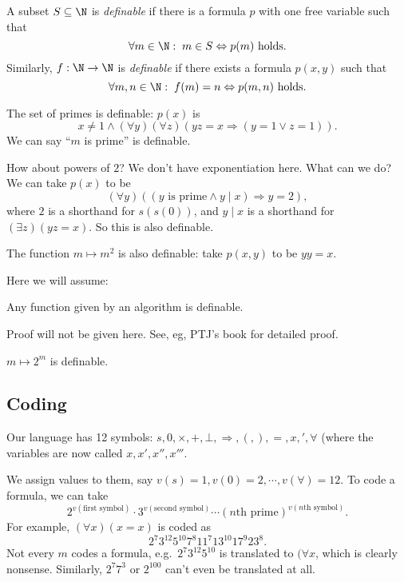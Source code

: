 \documentclass[a4paper]{article}
\begin{document}
\begin{defi}[Definability]
  A subset $S\subseteq \N$ is \emph{definable} if there is a formula $p$ with one free variable such that
  \[
    \forall m\in \N:\; m\in S \Leftrightarrow p(m)\text{ holds}.
  \]
  Similarly, $f: \N \to \N$ is \emph{definable} if there exists a formula $p(x, y)$ such that
  \[
    \forall m, n\in \N:\; f(m) = n \Leftrightarrow p(m, n)\text{ holds}.
  \]
\end{defi}

\begin{eg}
  The set of primes is definable: $p(x)$ is
  \[
    x\not = 1 \wedge (\forall y)(\forall z)(yz = x \Rightarrow (y = 1\vee z = 1)).
  \]
  We can say ``$m$ is prime'' is definable.

  How about powers of $2$? We don't have exponentiation here. What can we do? We can take $p(x)$ to be
  \[
    (\forall y)((y\text{ is prime}\wedge y \mid x) \Rightarrow y = 2),
  \]
  where $2$ is a shorthand for $s(s(0))$, and $y\mid x$ is a shorthand for $(\exists z)(yz = x)$. So this is also definable.

  The function $m\mapsto m^2$ is also definable: take $p(x, y)$ to be $yy = x$.
\end{eg}

Here we will assume:
\begin{fact}
  Any function given by an algorithm is definable.
\end{fact}
Proof will not be given here. See, eg, PTJ's book for detailed proof.

\begin{eg}
  $m\mapsto 2^m$ is definable.
\end{eg}

\subsection*{Coding}
Our language has 12 symbols: $s, 0, \times, +, \bot, \Rightarrow, (, ), =, x, ', \forall$ (where the variables are now called $x, x', x'', x'''$.

We assign values to them, say $v(s) = 1, v(0) = 2, \cdots, v(\forall) = 12$. To code a formula, we can take
\[
  2^{v(\text{first symbol})}\cdot 3^{v(\text{second symbol})}\cdots (n\text{th prime})^{v(n\text{th symbol})}.
\]
For example, $(\forall x)(x = x)$ is coded as
\[
  2^7 3^{12}5^{10}7^8 11^7 13^{10}17^9 23^8.
\]
Not every $m$ codes a formula, e.g.\ $2^7 3^{12}5^{10}$ is translated to $(\forall x$, which is clearly nonsense. Similarly, $2^7 7^3$ or $2^{100}$ can't even be translated at all.
\end{document}
